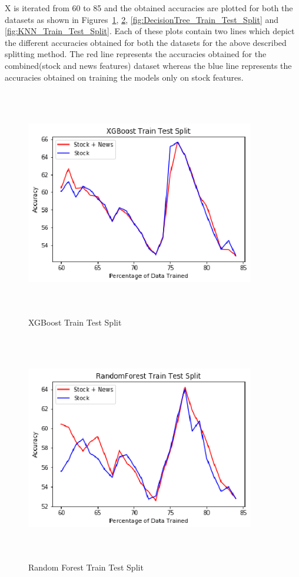 \documentclass[preprint,12pt]{elsarticle}
\begin{document}
X is iterated from 60 to 85 and the obtained accuracies are plotted for both the datasets as shown in Figures~\ref{fig:XGBoost_Train_Test_Split}, \ref{fig:RandomForest_Train_Test_Split}, \ref{fig:DecisionTree_Train_Test_Split} and  \ref{fig:KNN_Train_Test_Split}. Each of these plots contain two lines which depict the different accuracies obtained for both the datasets for the above described splitting method. The red line represents the accuracies obtained for the combined(stock and news features) dataset whereas the blue line represents the accuracies obtained on training the models only on stock features.

\begin{figure}[H]
\centering
\includegraphics[width=10cm,height=10cm,keepaspectratio]{XGBoost_Grid_Search_Acc.eps}
\caption{\label{fig:XGBoost_Train_Test_Split} XGBoost Train Test Split}
\end{figure}

\begin{figure}[H]
\centering
\includegraphics[width=10cm,height=10cm,keepaspectratio]{RandomForest_Grid_Search_Acc.eps}
\caption{\label{fig:RandomForest_Train_Test_Split} Random Forest Train Test Split}
\end{figure}
\end{document}
